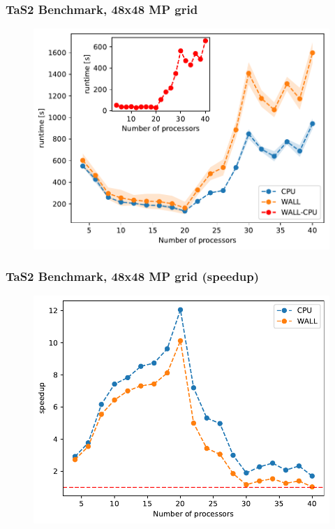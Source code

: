 \documentclass{beamer}
\begin{document}
\begin{frame}
    \frametitle{TaS2 Benchmark, 48x48 MP grid}
    \begin{figure}
        \includegraphics[width=\linewidth, height=\textheight,keepaspectratio]{TaS2_bench_nprocs_48x48.pdf}
    \end{figure}
\end{frame}

\begin{frame}
    \frametitle{TaS2 Benchmark, 48x48 MP grid (speedup)}
    \begin{figure}
        \includegraphics[width=\linewidth, height=\textheight,keepaspectratio]{TaS2_bench_nprocs_48x48_speedup.pdf}
    \end{figure}
\end{frame}
\end{document}
